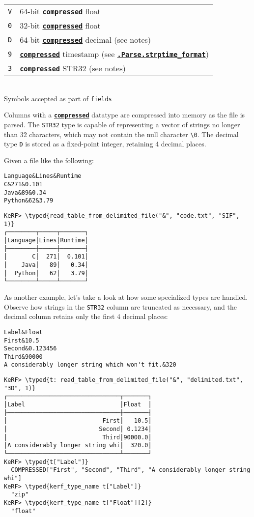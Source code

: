 \documentclass{article}
\newcommand{\typed}[1]{\textcolor{TealBlue}{#1}}
\newcommand{\primu}[2]{\hyperref[prim:#2]{\textbf{\texttt{#1}}}}
\newcommand{\prim}[1]{\primu{#1}{#1}}
\newcommand{\const}[2]{\hyperref[const:#2]{\textbf{\texttt{#1}}}}
\begin{document}
\begin{table}[h]
\begin{tabular}{| c | l |}
		\texttt{V} & 64-bit \prim{compressed} float \\
		\texttt{0} & 32-bit \prim{compressed} float \\
		\texttt{D} & 64-bit \prim{compressed} decimal (see notes) \\
		\texttt{9} & \prim{compressed} timestamp (see \const{.Parse.strptime\_format}{parseStrptimeFormat})\\
		\texttt{3} & \prim{compressed} STR32 (see notes) \\
		\hline
	\end{tabular}
	\\ \bigskip Symbols accepted as part of \texttt{fields}
\end{table}

\pagebreak
Columns with a \prim{compressed} datatype are compressed into memory as the file is parsed. The \texttt{STR32} type is capable of representing a vector of strings no longer than 32 characters, which may not contain the null character \texttt{\textbackslash 0}. The decimal type \texttt{D} is stored as a fixed-point integer, retaining 4 decimal places.


Given a file like the following:
\begin{Verbatim}
Language&Lines&Runtime
C&271&0.101
Java&89&0.34
Python&62&3.79
\end{Verbatim}

\begin{Verbatim}
KeRF> \typed{read_table_from_delimited_file("&", "code.txt", "SIF", 1)}
┌────────┬─────┬───────┐
│Language│Lines│Runtime│
├────────┼─────┼───────┤
│       C│  271│  0.101│
│    Java│   89│   0.34│
│  Python│   62│   3.79│
└────────┴─────┴───────┘
\end{Verbatim}

As another example, let's take a look at how some specialized types are handled. Observe how strings in the \texttt{STR32} column are truncated as necessary, and the decimal column retains only the first 4 decimal places:
\begin{Verbatim}
Label&Float
First&10.5
Second&0.123456
Third&90000
A considerably longer string which won't fit.&320
\end{Verbatim}
\begin{Verbatim}
KeRF> \typed{t: read_table_from_delimited_file("&", "delimited.txt", "3D", 1)}
┌────────────────────────────────┬───────┐
│Label                           │Float  │
├────────────────────────────────┼───────┤
│                           First│   10.5│
│                          Second│ 0.1234│
│                           Third│90000.0│
│A considerably longer string whi│  320.0│
└────────────────────────────────┴───────┘
KeRF> \typed{t["Label"]}
  COMPRESSED["First", "Second", "Third", "A considerably longer string whi"]
KeRF> \typed{kerf_type_name t["Label"]}
  "zip"
KeRF> \typed{kerf_type_name t["Float"][2]}
  "float"
\end{Verbatim}
\end{document}
